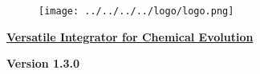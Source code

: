 
\begin{center} 
\begin{figure}[!h] 
\centering 
\texttt{[image: ../../../../logo/logo.png]} 
\end{figure} 
\underline{\LARGE \textbf{Versatile Integrator for Chemical Evolution}} 
\par 
{\Large \textbf{Version 1.3.0}} 
\end{center}
